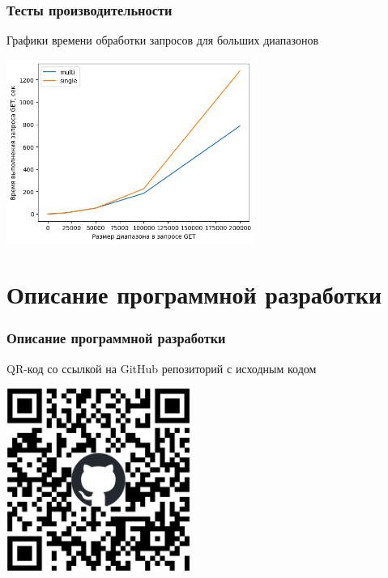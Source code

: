 \documentclass[pdf, hyperref={unicode}, aspectratio=169]{beamer}
\begin{document}
\begin{frame}
	\frametitle{Тесты производительности}
	
	Графики времени обработки запросов для больших диапазонов
	
	\begin{center}
		\includegraphics[height = 6cm]{bench2e5.png}
	\end{center}
\end{frame}


\section{Описание программной разработки}
\begin{frame}
	\frametitle{Описание программной разработки}
	
	QR-код со ссылкой на GitHub репозиторий с исходным кодом
	
	\begin{center}
		\includegraphics[height = 6cm]{qr-git.eps}
	\end{center}
\end{frame}
\end{document}
